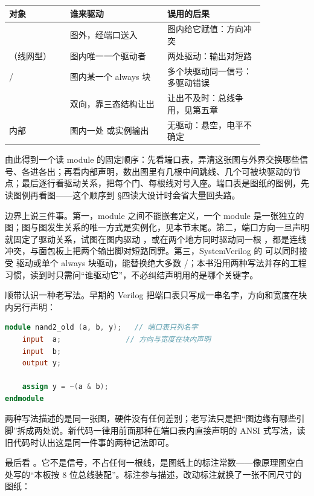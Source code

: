 \begin{longtable}{L{0.2\linewidth}L{0.32\linewidth}L{0.32\linewidth}}
\toprule
对象 & 谁来驱动 & 误用的后果 \\
\midrule
{} & 图外，经端口送入 & 图内给它赋值：方向冲突 \\
（线网型） & 图内唯一一个驱动者 & 两处驱动：输出对短路 \\
/ & 图内某一个 always 块 & 多个块驱动同一信号：多驱动错误 \\
 & 双向，靠三态结构让出 & 让出不及时：总线争用，见第五章 \\
内部  & 图内一处  或实例输出 & 无驱动：悬空，电平不确定 \\
\bottomrule
\end{longtable}

由此得到一个读 module 的固定顺序：先看端口表，弄清这张图与外界交换哪些信号、各进各出；再看内部声明，数出图里有几根中间跳线、几个可被块驱动的节点；最后逐行看驱动关系，把每个门、每根线对号入座。端口表是图纸的图例，先读图例再看图——这个顺序到 §四读大设计时会省大量回头路。

边界上说三件事。第一，module 之间不能嵌套定义，一个 module 是一张独立的图；图与图发生关系的唯一方式是实例化，见本节末尾。第二，端口方向一旦声明就固定了驱动关系，试图在图内驱动 ，或在两个地方同时驱动同一根 ，都是连线冲突，与面包板上把两个输出脚对短路同罪。第三，SystemVerilog 的  可以同时接受  驱动或单个 always 块驱动，能替换绝大多数 /；本书沿用两种写法并存的工程习惯，读到时只需问“谁驱动它”，不必纠结声明用的是哪个关键字。

顺带认识一种老写法。早期的 Verilog 把端口表只写成一串名字，方向和宽度在块内另行声明：

\begin{lstlisting}[language=Verilog]
module nand2_old (a, b, y);   // 端口表只列名字
    input  a;               // 方向与宽度在块内声明
    input  b;
    output y;

    assign y = ~(a & b);
endmodule
\end{lstlisting}

两种写法描述的是同一张图，硬件没有任何差别；老写法只是把“图边缘有哪些引脚”拆成两处说。新代码一律用前面那种在端口表内直接声明的 ANSI 式写法，读旧代码时认出这是同一件事的两种记法即可。

最后看 。它不是信号，不占任何一根线，是图纸上的标注常数——像原理图空白处写的“本板按 8 位总线装配”。标注参与描述，改动标注就换了一张不同尺寸的图纸：

